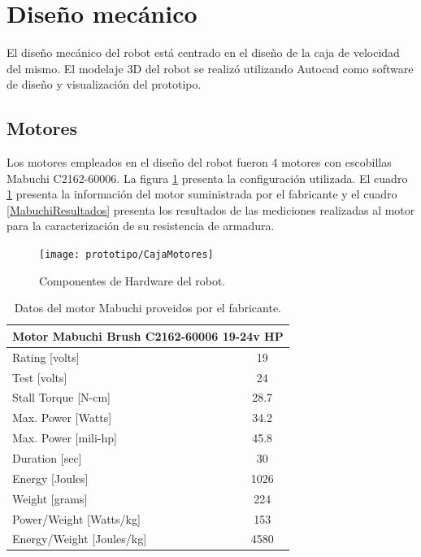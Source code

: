 \section{Diseño mecánico}


El diseño mecánico del robot está centrado en el diseño de la caja de velocidad del mismo. El modelaje 3D del robot se realizó utilizando Autocad como software de diseño y visualización del prototipo.



\subsection{Motores}

Los motores empleados en el diseño del robot fueron 4 motores con escobillas Mabuchi  C2162-60006. La figura \ref{imagen:prototipo/CajaMotores} presenta la configuración utilizada. El cuadro \ref{MabuchiDatasheet} presenta la información del motor suministrada por el fabricante y el cuadro \ref{MabuchiResultados} presenta los resultados de las mediciones realizadas al motor para la caracterización de su resistencia de armadura.

\begin{figure}[H]
	\centering
	\texttt{[image: prototipo/CajaMotores]}
	\caption[Motores Mabuchi empleados en el diseño del prototipo]{Componentes de Hardware del robot.}
	\label{imagen:prototipo/CajaMotores}
\end{figure}

\begin{table}[htbp]
	\caption[Datos del motor Mabuchi]{Datos del motor Mabuchi proveidos por el fabricante.}
	\centering
	\begin{tabular}{|l|c|}
		\hline
		\multicolumn{ 2}{|c|}{\textbf{Motor  Mabuchi Brush C2162-60006 19-24v HP}} \\ \hline
		Rating [volts] & 19 \\ \hline
		Test [volts] & 24 \\ \hline
		Stall Torque [N-cm] & 28.7 \\ \hline
		Max. Power [Watts] & 34.2 \\ \hline
		Max. Power [mili-hp] & 45.8 \\ \hline
		Duration [sec] & 30 \\ \hline
		Energy [Joules] & 1026 \\ \hline
		Weight [grams] & 224 \\ \hline
		Power/Weight [Watts/kg] & 153 \\ \hline
		Energy/Weight [Joules/kg] & 4580 \\ \hline
	\end{tabular}
	\label{MabuchiDatasheet}
\end{table}



